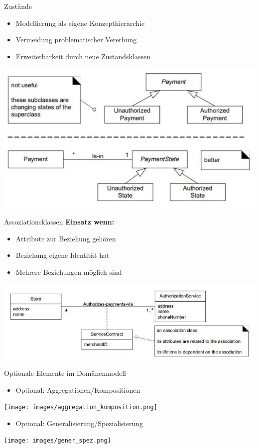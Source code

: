 \begin{concept}{Zustände}
\begin{itemize}
    \item Modellierung als eigene Konzepthierarchie
    \item Vermeidung problematischer Vererbung
    \item Erweiterbarkeit durch neue Zustandsklassen
\end{itemize}
\includegraphics[width=0.9\linewidth]{images/2024_12_29_0d1d7b5551ea1b4b41bdg-07(1)}
\end{concept}

\begin{concept}{Assoziationsklassen}
\textbf{Einsatz wenn:}
\begin{itemize}
    \item Attribute zur Beziehung gehören
    \item Beziehung eigene Identität hat
    \item Mehrere Beziehungen möglich sind
\end{itemize}
\includegraphics[width=\linewidth]{images/2024_12_29_0d1d7b5551ea1b4b41bdg-07}
\end{concept}


\begin{definition}{Optionale Elemente im Domänenmodell}
\begin{itemize}
    \item Optional: Aggregationen/Kompositionen
\end{itemize}
\texttt{[image: images/aggregation\_komposition.png]}
\begin{itemize}
    \item Optional: Generalisierung/Spezialisierung
\end{itemize}
\texttt{[image: images/gener\_spez.png]}
\end{definition}

